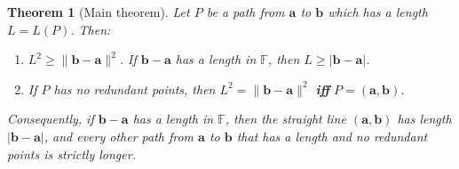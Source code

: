 \documentclass[11pt]{article}
\theoremstyle{plain}
\newtheorem{theorem}{Theorem}[section]
\theoremstyle{definition}
\theoremstyle{remark}
\begin{document}
\begin{theorem}[Main theorem]\label{thm:main}
Let $P$ be a path from $\mathbf{a}$ to $\mathbf{b}$ which has a length $L = L(P)$. Then:
\begin{enumerate}
    \item[(i)] $L^2 \geq \|\mathbf{b} - \mathbf{a}\|^2$. If $\mathbf{b} - \mathbf{a}$ has a length in $\mathbb{F}$, then $L \geq |\mathbf{b} - \mathbf{a}|$.
    \item[(ii)] If $P$ has no redundant points, then $L^2 = \|\mathbf{b} - \mathbf{a}\|^2$ \textbf{iff} $P = (\mathbf{a}, \mathbf{b})$.
\end{enumerate}
Consequently, if $\mathbf{b} - \mathbf{a}$ has a length in $\mathbb{F}$, then the straight line $(\mathbf{a}, \mathbf{b})$ has length $|\mathbf{b} - \mathbf{a}|$, and every other path from $\mathbf{a}$ to $\mathbf{b}$ that has a length and no redundant points is strictly longer.
\end{theorem}
\end{document}
